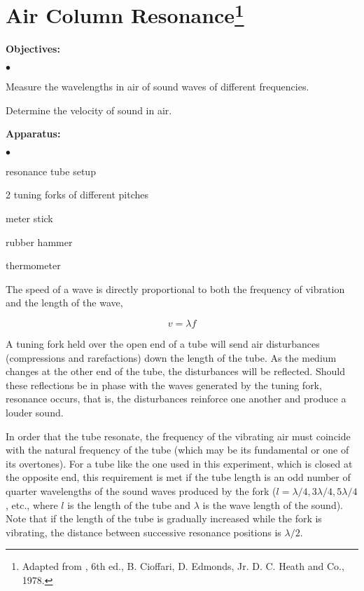
\section{Air Column Resonance\footnote{
Adapted from , 6th ed., B. Cioffari, D. Edmonds,
Jr. D. C. Heath and Co., 1978.
}}

\makelabheader %



{\noindent \bf Objectives:} \begin{list}{$\bullet$}{\itemsep0pt }

\item Measure the wavelengths in air of sound waves of different frequencies.

\item Determine the velocity of sound in air.

\end{list}

{\noindent \bf Apparatus:} \begin{list}{$\bullet$}{\itemsep0pt }

\item resonance tube setup \item 2 tuning forks of different pitches \item meter stick \item rubber hammer \item thermometer
\end{list}


The speed
of a wave is directly proportional to both the frequency of vibration and the length of the wave,

\begin{equation} v = \lambda f \end{equation}

\noindent A tuning fork held over the open end of a tube will send air disturbances (compressions and rarefactions) down the length of the tube. As the medium changes at the other end of the tube, the disturbances will be reflected. Should these reflections be in phase with the waves generated by the tuning fork, resonance occurs, that is, the disturbances reinforce one another and produce a louder sound.

\noindent In order that the tube resonate, the frequency of the vibrating air must coincide with the natural frequency of the tube (which may be its fundamental or one of its overtones). For a tube like the one used in this experiment, which is closed at the opposite end, this requirement is met if the tube length is an odd number of quarter wavelengths of the sound waves produced by the fork ($l = \lambda/4, 3 \lambda/4, 5 \lambda/4$, etc., where $l$ is the length of the tube and $\lambda$ is the wave length of the sound). Note that if the length of the tube is gradually increased while the fork is vibrating, the distance between successive resonance positions is $\lambda/2$. 

